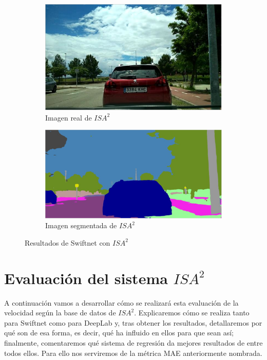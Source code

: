 \begin{figure}[H]
\centering
  \begin{subfigure}[b]{0.45\linewidth}
    \includegraphics[width=\linewidth]{Figuras/Imagen_ISA2_Real.eps}
    \caption{Imagen real de $ISA^{2}$}
  \end{subfigure}
    \begin{subfigure}[b]{0.45\linewidth}
    \includegraphics[width=\linewidth]{Figuras/Imagen_ISA2_Segmentada.eps}
    \caption{Imagen segmentada de $ISA^{2}$}
  \end{subfigure}
  \caption{Resultados de Swiftnet con $ISA^{2}$}
\end{figure}

\section{Evaluación del sistema $ISA^{2}$}

A continuación vamos a desarrollar cómo se realizará esta evaluación de la velocidad según la base de datos de $ISA^{2}$. Explicaremos cómo se realiza tanto para Swiftnet como para DeepLab y, tras obtener los resultados, detallaremos por qué son de esa forma, es decir, qué ha influido en ellos para que sean así; finalmente, comentaremos qué sistema de regresión da mejores resultados de entre todos ellos. Para ello nos serviremos de la métrica \ac{MAE} anteriormente nombrada.

